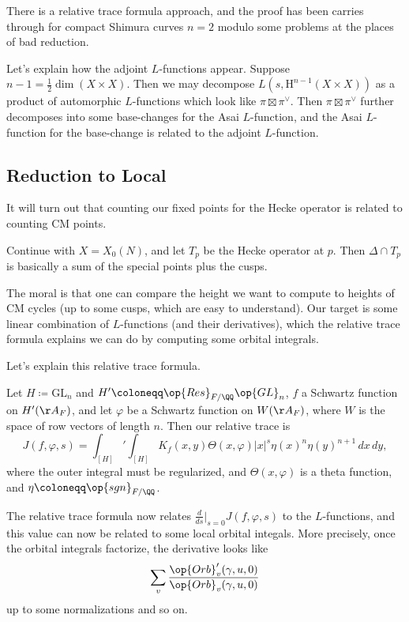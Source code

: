 \documentclass{article}
\begin{document}
There is a relative trace formula approach, and the proof has been carries through for compact Shimura curves $n=2$ modulo some problems at the places of bad reduction.
\begin{remark}
	Let's explain how the adjoint $L$-functions appear. Suppose $n-1=\frac12\dim(X\times X)$. Then we may decompose $L\left(s,\mathrm H^{n-1}(X\times X)\right)$ as a product of automorphic $L$-functions which look like $\pi\boxtimes\pi^\lor$. Then $\pi\boxtimes\pi^\lor$ further decomposes into some base-changes for the Asai $L$-function, and the Asai $L$-function for the base-change is related to the adjoint $L$-function.
\end{remark}

\subsection{Reduction to Local}
It will turn out that counting our fixed points for the Hecke operator is related to counting CM points.
\begin{example}
	Continue with $X=X_0(N)$, and let $T_p$ be the Hecke operator at $p$. Then $\Delta\cap T_p$ is basically a sum of the special points plus the cusps.
\end{example}
The moral is that one can compare the height we want to compute to heights of CM cycles (up to some cusps, which are easy to understand). Our target is some linear combination of $L$-functions (and their derivatives), which the relative trace formula explains we can do by computing some orbital integrals.

Let's explain this relative trace formula.
\begin{example}
	Let $H\coloneqq\mathrm{GL}_n$ and $H'\coloneqq\op{Res}_{F/\QQ}\op{GL}_n$, $f$ a Schwartz function on $H'(\AA_F)$, and let $\varphi$ be a Schwartz function on $W(\AA_F)$, where $W$ is the space of row vectors of length $n$. Then our relative trace is
	\[J(f,\varphi,s)=\int_{[H]}'\int_{[H]}K_f(x,y)\Theta(x,\varphi)\left|x\right|^s\eta(x)^n\eta(y)^{n+1}\,dx\,dy,\]
	where the outer integral must be regularized, and $\Theta(x,\varphi)$ is a theta function, and $\eta\coloneqq\op{sgn}_{F/\QQ}$.
\end{example}
The relative trace formula now relates $\frac d{ds}\big|_{s=0}J(f,\varphi,s)$ to the $L$-functions, and this value can now be related to some local orbital integals. More precisely, once the orbital integrals factorize, the derivative looks like
\[\sum_v\frac{\op{Orb}_v'(\gamma,u,0)}{\op{Orb}_v(\gamma,u,0)}\]
up to some normalizations and so on.
\end{document}
